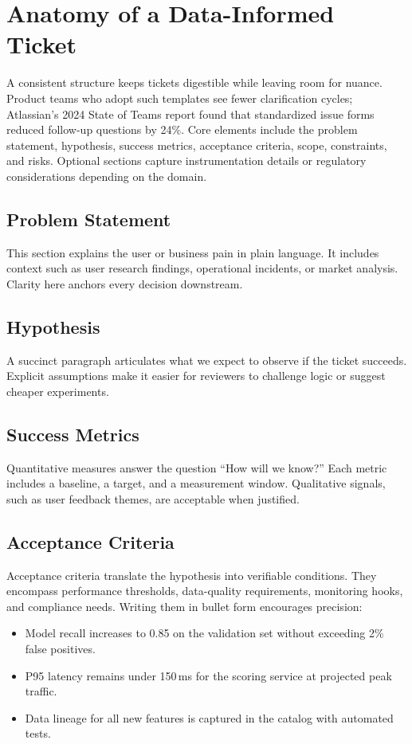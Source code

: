 \section{Anatomy of a Data-Informed Ticket}
\label{sec:ticket-anatomy}

A consistent structure keeps tickets digestible while leaving room for nuance. Product teams who adopt such templates see fewer clarification cycles; Atlassian’s 2024 State of Teams report found that standardized issue forms reduced follow-up questions by 24\%. Core elements include the problem statement, hypothesis, success metrics, acceptance criteria, scope, constraints, and risks. Optional sections capture instrumentation details or regulatory considerations depending on the domain.

\subsection{Problem Statement}
This section explains the user or business pain in plain language. It includes context such as user research findings, operational incidents, or market analysis. Clarity here anchors every decision downstream.

\subsection{Hypothesis}
A succinct paragraph articulates what we expect to observe if the ticket succeeds. Explicit assumptions make it easier for reviewers to challenge logic or suggest cheaper experiments.

\subsection{Success Metrics}
Quantitative measures answer the question ``How will we know?'' Each metric includes a baseline, a target, and a measurement window. Qualitative signals, such as user feedback themes, are acceptable when justified.

\subsection{Acceptance Criteria}
Acceptance criteria translate the hypothesis into verifiable conditions. They encompass performance thresholds, data-quality requirements, monitoring hooks, and compliance needs. Writing them in bullet form encourages precision:
\begin{itemize}
    \item Model recall increases to 0.85 on the validation set without exceeding 2\% false positives.
    \item P95 latency remains under 150\,ms for the scoring service at projected peak traffic.
    \item Data lineage for all new features is captured in the catalog with automated tests.
\end{itemize}

